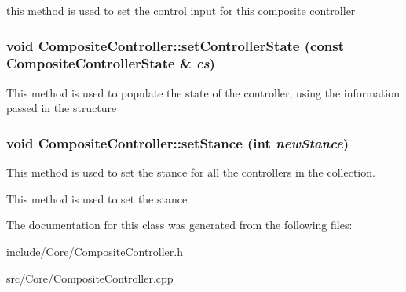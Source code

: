 \label{classCartWheel_1_1Core_1_1CompositeController_aa5626576d57b939b33f9db8bb2d81300}
this method is used to set the control input for this composite controller \hypertarget{classCartWheel_1_1Core_1_1CompositeController_a5277d117be5a1a6fc5df91d14d99f2aa}{
\subsubsection[{setControllerState}]{\setlength{\rightskip}{0pt plus 5cm}void CompositeController::setControllerState (const {\bf CompositeControllerState} \& {\em cs})}}
\label{classCartWheel_1_1Core_1_1CompositeController_a5277d117be5a1a6fc5df91d14d99f2aa}
This method is used to populate the state of the controller, using the information passed in the structure \hypertarget{classCartWheel_1_1Core_1_1CompositeController_a59a7bcf071ceb4b136a0842e5379127c}{
\subsubsection[{setStance}]{\setlength{\rightskip}{0pt plus 5cm}void CompositeController::setStance (int {\em newStance})}}
\label{classCartWheel_1_1Core_1_1CompositeController_a59a7bcf071ceb4b136a0842e5379127c}
This method is used to set the stance for all the controllers in the collection.

This method is used to set the stance 

The documentation for this class was generated from the following files:\begin{DoxyCompactItemize}
\item 
include/Core/CompositeController.h\item 
src/Core/CompositeController.cpp\end{DoxyCompactItemize}
